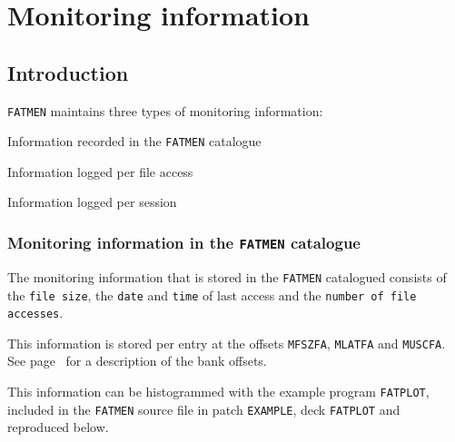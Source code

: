 \chapter{Monitoring information}

\section{Introduction}

{\tt FATMEN} maintains three types of monitoring information:

\begin{OL}
\item
Information recorded in the {\tt FATMEN} catalogue
\item
Information logged per file access
\item
Information logged per session
\end{OL}

\subsection{Monitoring information in the {\tt FATMEN} catalogue}

The monitoring information that is stored in the {\tt FATMEN} catalogued
consists of the {\tt file size}, the {\tt date} and {\tt time} of
last access and the {\tt number of file accesses}.

This information is stored per entry at the offsets {\tt MFSZFA},
{\tt MLATFA} and {\tt MUSCFA}. See page~\pageref{BANK-OFFSETS}
for a description of the bank offsets.

This information can be histogrammed with the example program
{\tt FATPLOT}, included in the {\tt FATMEN} source file
in patch {\tt EXAMPLE}, deck {\tt FATPLOT} and reproduced below.

